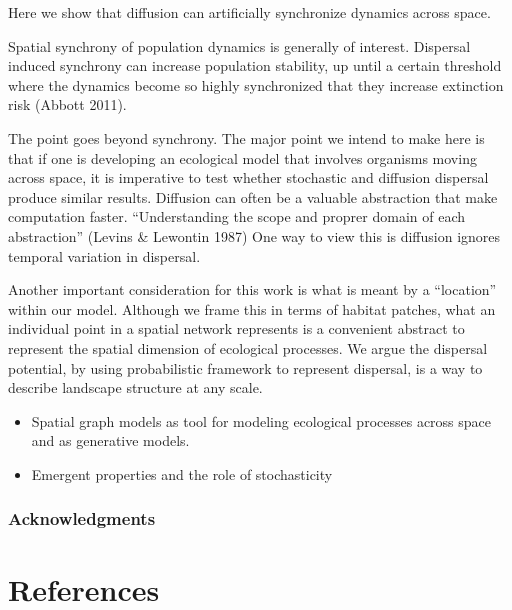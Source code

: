 \documentclass[10pt,oneside]{article}
\begin{document}
Here we show that diffusion can artificially synchronize dynamics across
space.

Spatial synchrony of population dynamics is generally of interest.
Dispersal induced synchrony can increase population stability, up until
a certain threshold where the dynamics become so highly synchronized
that they increase extinction risk (Abbott 2011).

The point goes beyond synchrony. The major point we intend to make here
is that if one is developing an ecological model that involves organisms
moving across space, it is imperative to test whether stochastic and
diffusion dispersal produce similar results. Diffusion can often be a
valuable abstraction that make computation faster. ``Understanding the
scope and proprer domain of each abstraction'' (Levins \& Lewontin 1987)
One way to view this is diffusion ignores temporal variation in
dispersal.

Another important consideration for this work is what is meant by a
``location'' within our model. Although we frame this in terms of
habitat patches, what an individual point in a spatial network
represents is a convenient abstract to represent the spatial dimension
of ecological processes. We argue the dispersal potential, by using
probabilistic framework to represent dispersal, is a way to describe
landscape structure at any scale.

\begin{itemize}
\tightlist
\item
  Spatial graph models as tool for modeling ecological processes across
  space and as generative models.
\item
  Emergent properties and the role of stochasticity
\end{itemize}

\hypertarget{acknowledgments}{%
\subsubsection{Acknowledgments}\label{acknowledgments}}

\hypertarget{references}{%
\section*{References}\label{references}}
\end{document}
